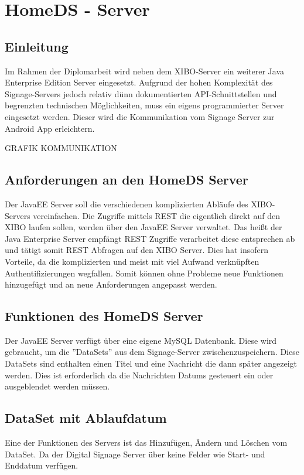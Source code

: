 \chapter{HomeDS - Server}
\section{Einleitung}\label{sec:einleitung}
Im Rahmen der Diplomarbeit wird neben dem XIBO-Server ein weiterer Java Enterprise Edition Server eingesetzt. Aufgrund der hohen Komplexität des Signage-Servers jedoch relativ dünn dokumentierten API-Schnittstellen und begrenzten technischen Möglichkeiten, muss ein eigens programmierter Server eingesetzt werden. Dieser wird die Kommunikation vom Signage Server zur Android App erleichtern. 

GRAFIK KOMMUNIKATION
 
\section{Anforderungen an den HomeDS Server}\label{sec:homeds}
Der JavaEE Server soll die verschiedenen komplizierten Abläufe des XIBO-Servers vereinfachen. Die  Zugriffe mittels REST die eigentlich direkt auf den XIBO laufen sollen, werden über den JavaEE Server verwaltet. Das heißt der Java Enterprise Server empfängt REST Zugriffe verarbeitet diese entsprechen ab und tätigt somit REST Abfragen auf den XIBO Server. Dies hat insofern Vorteile, da die komplizierten und meist mit viel Aufwand verknüpften Authentifizierungen wegfallen. Somit können ohne Probleme neue Funktionen hinzugefügt und  an neue Anforderungen angepasst werden.
 
\section{Funktionen des HomeDS Server}\label{sec:homedsfunction}
Der JavaEE Server verfügt über eine eigene MySQL Datenbank. Diese wird gebraucht, um die ''DataSets'' aus dem Signage-Server zwischenzuspeichern. Diese DataSets sind enthalten einen Titel und eine Nachricht die dann später angezeigt werden. Dies ist erforderlich da die Nachrichten Datums gesteuert ein oder ausgeblendet werden müssen.
 
\section{DataSet mit Ablaufdatum}\label{sec:datasetexpiredate}
Eine der Funktionen des Servers ist das Hinzufügen, Ändern und Löschen vom DataSet. Da der Digital Signage Server über keine Felder wie Start- und Enddatum verfügen.

